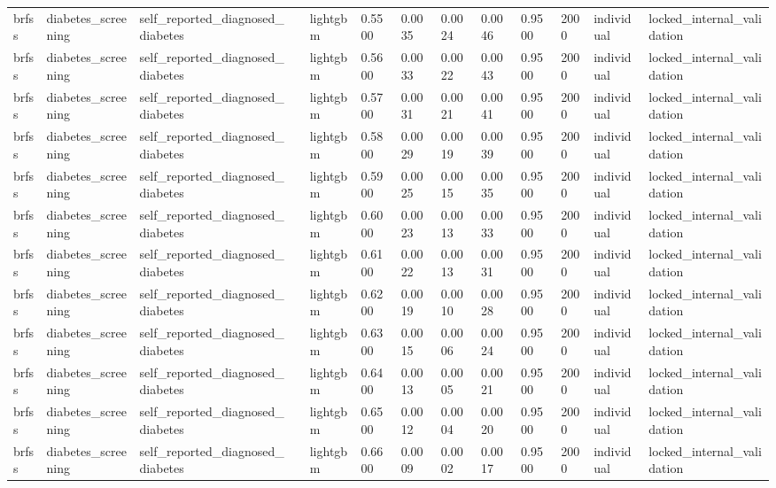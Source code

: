\begin{tabular}{lllllllllllll}
brfss & diabetes\_screening & self\_reported\_diagnosed\_diabetes &  & lightgbm & 0.5500 & 0.0035 & 0.0024 & 0.0046 & 0.9500 & 2000 & individual & locked\_internal\_validation \\
brfss & diabetes\_screening & self\_reported\_diagnosed\_diabetes &  & lightgbm & 0.5600 & 0.0033 & 0.0022 & 0.0043 & 0.9500 & 2000 & individual & locked\_internal\_validation \\
brfss & diabetes\_screening & self\_reported\_diagnosed\_diabetes &  & lightgbm & 0.5700 & 0.0031 & 0.0021 & 0.0041 & 0.9500 & 2000 & individual & locked\_internal\_validation \\
brfss & diabetes\_screening & self\_reported\_diagnosed\_diabetes &  & lightgbm & 0.5800 & 0.0029 & 0.0019 & 0.0039 & 0.9500 & 2000 & individual & locked\_internal\_validation \\
brfss & diabetes\_screening & self\_reported\_diagnosed\_diabetes &  & lightgbm & 0.5900 & 0.0025 & 0.0015 & 0.0035 & 0.9500 & 2000 & individual & locked\_internal\_validation \\
brfss & diabetes\_screening & self\_reported\_diagnosed\_diabetes &  & lightgbm & 0.6000 & 0.0023 & 0.0013 & 0.0033 & 0.9500 & 2000 & individual & locked\_internal\_validation \\
brfss & diabetes\_screening & self\_reported\_diagnosed\_diabetes &  & lightgbm & 0.6100 & 0.0022 & 0.0013 & 0.0031 & 0.9500 & 2000 & individual & locked\_internal\_validation \\
brfss & diabetes\_screening & self\_reported\_diagnosed\_diabetes &  & lightgbm & 0.6200 & 0.0019 & 0.0010 & 0.0028 & 0.9500 & 2000 & individual & locked\_internal\_validation \\
brfss & diabetes\_screening & self\_reported\_diagnosed\_diabetes &  & lightgbm & 0.6300 & 0.0015 & 0.0006 & 0.0024 & 0.9500 & 2000 & individual & locked\_internal\_validation \\
brfss & diabetes\_screening & self\_reported\_diagnosed\_diabetes &  & lightgbm & 0.6400 & 0.0013 & 0.0005 & 0.0021 & 0.9500 & 2000 & individual & locked\_internal\_validation \\
brfss & diabetes\_screening & self\_reported\_diagnosed\_diabetes &  & lightgbm & 0.6500 & 0.0012 & 0.0004 & 0.0020 & 0.9500 & 2000 & individual & locked\_internal\_validation \\
brfss & diabetes\_screening & self\_reported\_diagnosed\_diabetes &  & lightgbm & 0.6600 & 0.0009 & 0.0002 & 0.0017 & 0.9500 & 2000 & individual & locked\_internal\_validation \\

\end{tabular}
